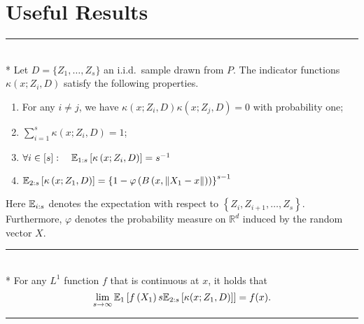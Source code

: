 \section{Useful Results}
\hrule

\begin{lem}\label{lem:dem12}\mbox{}\\*
	Let $D = \{Z_1, \dotsc, Z_s\}$ an i.i.d.\ sample drawn from $P$.
	The indicator functions $\kappa\left(x; Z_{i}, D\right)$ satisfy the following properties.
	\begin{enumerate}
		\item For any $i \neq j$, we have $\kappa\left(x; Z_{i}, D\right) \kappa\left(x;
			      Z_{j}, D\right)=0$ with probability one;
		\item $\sum_{i=1}^{s} \kappa\left(x; Z_{i}, D\right)=1$;
		\item $\forall i \in [s]: \quad \mathbb{E}_{1:s}\left[\kappa\left(x; Z_{i}, D\right)\right]=s^{-1}$
		\item $\mathbb{E}_{2: s}\left[\kappa\left(x; Z_1, D\right)\right]
			      = \left\{1-\varphi\left(B\left(x,\left\|X_1-x\right\|\right)\right)\right\}^{s-1}$
	\end{enumerate}
	Here $\mathbb{E}_{i: s}$ denotes the expectation with respect to $\left\{Z_{i}, Z_{i+1}, \dotsc, Z_s\right\}$.
	Furthermore, $\varphi$ denotes the probability measure on $\mathbb{R}^{d}$ induced by the random vector $X$.
\end{lem}

\hrule

\begin{lem}\label{lem:dem13}\mbox{}\\*
	For any $L^1$ function $f$ that is continuous at $x$, it holds that
	\begin{equation}
		\lim _{s \rightarrow \infty} \mathbb{E}_{1}\left[f\left(X_1\right) s \mathbb{E}_{2:s}\left[\kappa(x; Z_1, D)\right]\right]
		= f(x).
	\end{equation}
\end{lem}

\hrule

